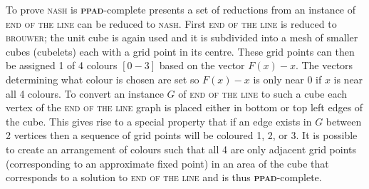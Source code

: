 \documentclass{article}
\begin{document}
\begin{multicols}{2}
To prove \textsc{nash} is \textbf{\textsc{ppad}}-complete \cite{Daskalakis.2009} presents a set of reductions from an instance of \textsc{end of the line} can be reduced to \textsc{nash}. First \textsc{end of the line} is reduced to \textsc{brouwer}; the unit cube is again used and it is subdivided into a mesh of smaller cubes (cubelets)  each with a grid point in its centre. These grid points can then be assigned 1 of 4 colours $[0-3]$ based on the vector $F(x)-x$. The vectors determining what colour is chosen are set so $F(x)-x$ is only near $0$ if $x$ is near all 4 colours. To convert an instance $G$ of \textsc{end of the line} to such a cube each vertex of the \textsc{end of the line} graph is placed either in bottom or top left edges of the cube. This gives rise to a special property that if an edge exists in $G$ between 2 vertices then a sequence of grid points will be coloured 1, 2, or 3. It is possible to create an arrangement of colours such that all 4 are only adjacent grid points (corresponding to an approximate fixed point) in an area of the cube that corresponds to a solution to \textsc{end of the line} and is thus \textbf{\textbf{\textsc{ppad}}}-complete.


\end{multicols}
\end{document}
